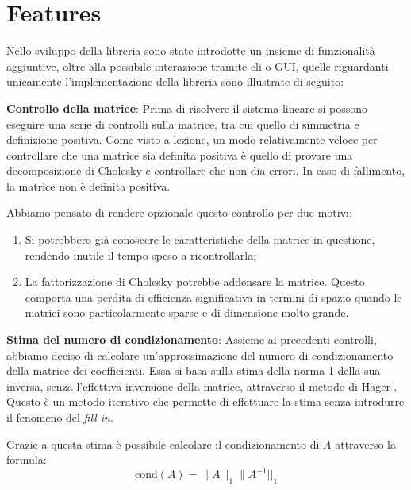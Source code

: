 \section{Features} \label{sec:feature}

Nello sviluppo della libreria sono state introdotte un insieme di funzionalità aggiuntive, oltre alla possibile interazione tramite cli o GUI, quelle riguardanti unicamente l'implementazione della libreria sono illustrate di seguito:

\begin{itemize}
	\begin{item}
		\textbf{Controllo della matrice}: Prima di risolvere il sistema lineare si possono eseguire una serie di controlli sulla matrice, tra cui quello di simmetria e definizione positiva. Come visto a lezione, un modo relativamente veloce per controllare che una matrice sia definita positiva è quello di provare una decomposizione di Cholesky e controllare che non dia errori. In caso di fallimento, la matrice non è definita positiva.
		
		Abbiamo pensato di rendere opzionale questo controllo per due motivi:
			\begin{enumerate}
				\item Si potrebbero già conoscere le caratteristiche della matrice in questione, rendendo inutile il tempo speso a ricontrollarla;
				\item La fattorizzazione di Cholesky potrebbe addensare la matrice. Questo comporta una perdita di efficienza significativa in termini di spazio quando le matrici sono particolarmente sparse e di dimensione molto grande.
			\end{enumerate}
	\end{item}
	\begin{item}
		\textbf{Stima del numero di condizionamento}: Assieme ai precedenti controlli, abbiamo deciso di calcolare un'approssimazione del numero di condizionamento della matrice dei coefficienti. Essa si basa sulla stima della norma 1 della sua inversa, senza l'effettiva inversione della matrice, attraverso il metodo di Hager \cite{hager, hager2}. Questo è un metodo iterativo che permette di effettuare la stima senza introdurre il fenomeno del \textit{fill-in}.
		
		Grazie a questa stima è possibile calcolare il condizionamento di $A$ attraverso la formula:
		$$ \textrm{cond}(A) = \|A\|_1  \|A^{-1}||_1$$
			

\end{item}
\end{itemize}
